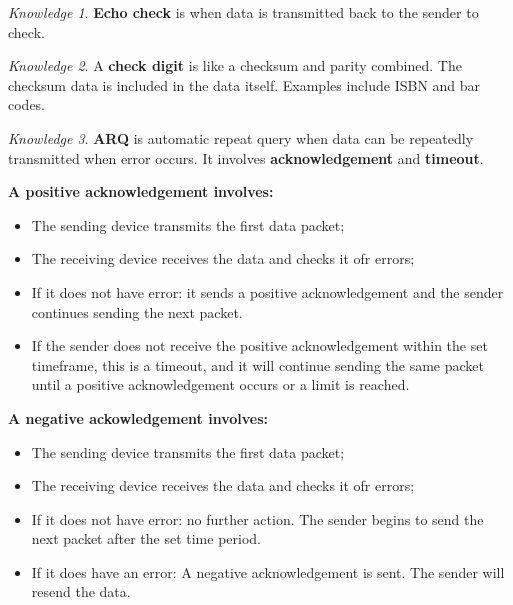 \documentclass[8pt]{article}
\theoremstyle{remark}
\newtheorem{knowledge}{Knowledge}[subsection]
\begin{document}
        \begin{knowledge}
            \textbf{Echo check} is when data is transmitted back to the sender to check.
        \end{knowledge}

        \begin{knowledge}
            A \textbf{check digit} is like a checksum and parity combined. The checksum data is included in the data itself. Examples include ISBN and bar codes. 
        \end{knowledge}

        \begin{knowledge}
            \textbf{ARQ} is automatic repeat query when data can be repeatedly transmitted when error occurs. It involves \textbf{acknowledgement} and \textbf{timeout}.

            \textbf{A positive acknowledgement involves:}
            \begin{itemize}
                \item The sending device transmits the first data packet;
                \item The receiving device receives the data and checks it ofr errors;
                \item If it does not have error: it sends a positive acknowledgement and the sender continues sending the next packet.
                \item If the sender does not receive the positive acknowledgement within the set timeframe, this is a timeout, and it will continue sending the same packet until a positive acknowledgement occurs or a limit is reached.
            \end{itemize}

            \textbf{A negative ackowledgement involves:}
            \begin{itemize}
                \item The sending device transmits the first data packet;
                \item The receiving device receives the data and checks it ofr errors;
                \item If it does not have error: no further action. The sender begins to send the next packet after the set time period.
                \item If it does have an error: A negative acknowledgement is sent. The sender will resend the data.
            \end{itemize}
        \end{knowledge}
\end{document}
